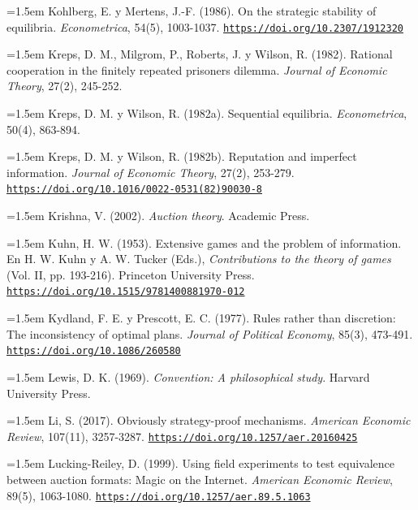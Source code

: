 \documentclass[10pt,a4paper]{article}
\begin{document}
\noindent\hangindent=1.5em Kohlberg, E. y Mertens, J.-F. (1986). On the strategic stability of equilibria. \textit{Econometrica}, 54(5), 1003-1037. \href{https://doi.org/10.2307/1912320}{\nolinkurl{https://doi.org/10.2307/1912320}}

\noindent\hangindent=1.5em Kreps, D. M., Milgrom, P., Roberts, J. y Wilson, R. (1982). Rational cooperation in the finitely repeated prisoners dilemma. \textit{Journal of Economic Theory}, 27(2), 245-252.

\noindent\hangindent=1.5em Kreps, D. M. y Wilson, R. (1982a). Sequential equilibria. \textit{Econometrica}, 50(4), 863-894.

\noindent\hangindent=1.5em Kreps, D. M. y Wilson, R. (1982b). Reputation and imperfect information. \textit{Journal of Economic Theory}, 27(2), 253-279. \href{https://doi.org/10.1016/0022-0531(82)90030-8}{\nolinkurl{https://doi.org/10.1016/0022-0531(82)90030-8}}

\noindent\hangindent=1.5em Krishna, V. (2002). \textit{Auction theory}. Academic Press.

\noindent\hangindent=1.5em Kuhn, H. W. (1953). Extensive games and the problem of information. En H. W. Kuhn y A. W. Tucker (Eds.), \textit{Contributions to the theory of games} (Vol. II, pp. 193-216). Princeton University Press. \href{https://doi.org/10.1515/9781400881970-012}{\nolinkurl{https://doi.org/10.1515/9781400881970-012}}

\noindent\hangindent=1.5em Kydland, F. E. y Prescott, E. C. (1977). Rules rather than discretion: The inconsistency of optimal plans. \textit{Journal of Political Economy}, 85(3), 473-491. \href{https://doi.org/10.1086/260580}{\nolinkurl{https://doi.org/10.1086/260580}}

\noindent\hangindent=1.5em Lewis, D. K. (1969). \textit{Convention: A philosophical study}. Harvard University Press.

\noindent\hangindent=1.5em Li, S. (2017). Obviously strategy-proof mechanisms. \textit{American Economic Review}, 107(11), 3257-3287. \href{https://doi.org/10.1257/aer.20160425}{\nolinkurl{https://doi.org/10.1257/aer.20160425}}

\noindent\hangindent=1.5em Lucking-Reiley, D. (1999). Using field experiments to test equivalence between auction formats: Magic on the Internet. \textit{American Economic Review}, 89(5), 1063-1080. \href{https://doi.org/10.1257/aer.89.5.1063}{\nolinkurl{https://doi.org/10.1257/aer.89.5.1063}}
\end{document}
